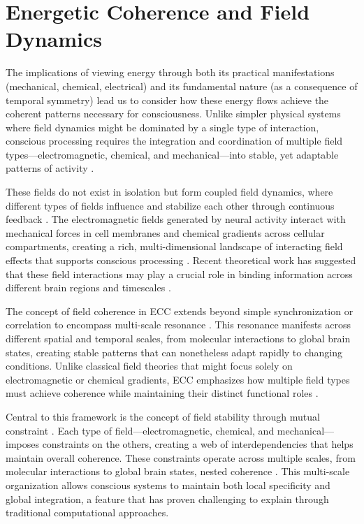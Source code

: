\section{Energetic Coherence and Field Dynamics}

The implications of viewing energy through both its practical manifestations (mechanical, chemical, electrical) and its fundamental nature (as a consequence of temporal symmetry) lead us to consider how these energy flows achieve the coherent patterns necessary for consciousness. Unlike simpler physical systems where field dynamics might be dominated by a single type of interaction, conscious processing requires the integration and coordination of multiple field types—electromagnetic, chemical, and mechanical—into stable, yet adaptable patterns of activity \cite{Freeman2006}.

These fields do not exist in isolation but form coupled field dynamics, where different types of fields influence and stabilize each other through continuous feedback \cite{McFadden2002}. The electromagnetic fields generated by neural activity interact with mechanical forces in cell membranes and chemical gradients across cellular compartments, creating a rich, multi-dimensional landscape of interacting field effects that supports conscious processing \cite{Pockett2012}. Recent theoretical work has suggested that these field interactions may play a crucial role in binding information across different brain regions and timescales \cite{Nunez2010}.

The concept of field coherence in ECC extends beyond simple synchronization or correlation to encompass multi-scale resonance \cite{Singer2009}. This resonance manifests across different spatial and temporal scales, from molecular interactions to global brain states, creating stable patterns that can nonetheless adapt rapidly to changing conditions. Unlike classical field theories that might focus solely on electromagnetic or chemical gradients, ECC emphasizes how multiple field types must achieve coherence while maintaining their distinct functional roles \cite{Haken2006}.

Central to this framework is the concept of field stability through mutual constraint \cite{Barrett2014}. Each type of field—electromagnetic, chemical, and mechanical—imposes constraints on the others, creating a web of interdependencies that helps maintain overall coherence. These constraints operate across multiple scales, from molecular interactions to global brain states, nested coherence \cite{Raichle2006}. This multi-scale organization allows conscious systems to maintain both local specificity and global integration, a feature that has proven challenging to explain through traditional computational approaches.

